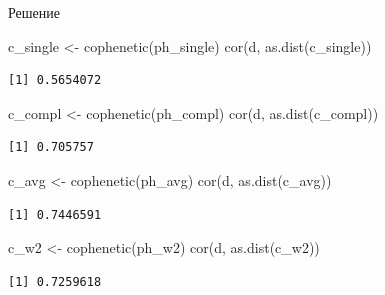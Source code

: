 \documentclass[
  ignorenonframetext,
  russian,
]{beamer}
\newenvironment{Shaded}{\begin{snugshade}}{\end{snugshade}}
\newcommand{\FunctionTok}[1]{\textcolor[rgb]{0.28,0.35,0.67}{#1}}
\newcommand{\NormalTok}[1]{\textcolor[rgb]{0.00,0.23,0.31}{#1}}
\newcommand{\OtherTok}[1]{\textcolor[rgb]{0.00,0.23,0.31}{#1}}
\begin{document}
\begin{frame}[fragile]{Решение}
\protect{}\label{ux440ux435ux448ux435ux43dux438ux435-2}
\scriptsize

\begin{Shaded}
\begin{Highlighting}[]
\NormalTok{c\_single }\OtherTok{\textless{}{-}} \FunctionTok{cophenetic}\NormalTok{(ph\_single)}
\FunctionTok{cor}\NormalTok{(d, }\FunctionTok{as.dist}\NormalTok{(c\_single))}
\end{Highlighting}
\end{Shaded}

\begin{verbatim}
[1] 0.5654072
\end{verbatim}

\begin{Shaded}
\begin{Highlighting}[]
\NormalTok{c\_compl }\OtherTok{\textless{}{-}} \FunctionTok{cophenetic}\NormalTok{(ph\_compl)}
\FunctionTok{cor}\NormalTok{(d, }\FunctionTok{as.dist}\NormalTok{(c\_compl))}
\end{Highlighting}
\end{Shaded}

\begin{verbatim}
[1] 0.705757
\end{verbatim}

\begin{Shaded}
\begin{Highlighting}[]
\NormalTok{c\_avg }\OtherTok{\textless{}{-}} \FunctionTok{cophenetic}\NormalTok{(ph\_avg)}
\FunctionTok{cor}\NormalTok{(d, }\FunctionTok{as.dist}\NormalTok{(c\_avg))}
\end{Highlighting}
\end{Shaded}

\begin{verbatim}
[1] 0.7446591
\end{verbatim}

\begin{Shaded}
\begin{Highlighting}[]
\NormalTok{c\_w2 }\OtherTok{\textless{}{-}} \FunctionTok{cophenetic}\NormalTok{(ph\_w2)}
\FunctionTok{cor}\NormalTok{(d, }\FunctionTok{as.dist}\NormalTok{(c\_w2))}
\end{Highlighting}
\end{Shaded}

\begin{verbatim}
[1] 0.7259618
\end{verbatim}
\end{frame}
\end{document}

